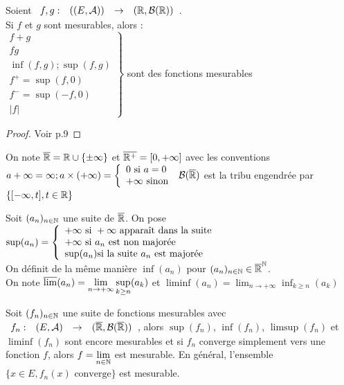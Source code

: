 \documentclass[]{report}
\begin{document}
\begin{prop}
    Soient $\begin{array}{ccccc} f,g : & ((E,\mathcal{A})) & \to & (\mathbb{R},\mathcal{B}(\mathbb{R})) \end{array}$.\\
    Si $f$ et $g$ sont mesurables, alors :\\
    $\left.\begin{array}{ll} f+g\\
    fg\\
    \inf(f,g);\sup(f,g)\\
    f^+=\sup(f,0)\\
    f^-=\sup(-f,0)\\
    |f|\end{array} \right\}$ sont des fonctions mesurables
\end{prop}

\begin{proof}
    Voir p.9
\end{proof}

\begin{df}
    On note $\overline{\mathbb{R}}=\mathbb{R}\cup\{\pm\infty\}$ et $\overline{\mathbb{R}^+}=[0,+\infty]$ avec les conventions $a+\infty=\infty;a\times(+\infty)=\left\{\begin{array}{ll} 0\text{ si }a=0\\
    +\infty\text{ sinon} \end{array} \right.$
    $\mathcal{B}(\overline{\mathbb{R}})$ est la tribu engendrée par $\{[-\infty,t],t\in\mathbb{R}\}$
\end{df}

\begin{df}
    Soit $(a_n)_{{n\in\mathbb{N}}}$ une suite de $\overline{\mathbb{R}}$. On pose $\sup(a_n)=\left\{\begin{array}{ll} +\infty\text{ si }+\infty\text{ apparaît dans la suite}\\
    +\infty\text{ si } a_n \text{ est non majorée}\\
    \sup (a_n)\text{si la suite }a_n\text{ est majorée} \end{array} \right.$\\
    On définit de la même manière $\inf(a_n)$ pour $(a_n)_{{n\in\mathbb{N}}}\in\overline{\mathbb{R}}^{\mathbb{N}}$. \\
    On note $\displaystyle{\overline{\lim}(a_n)=\lim_{n\to+\infty}\sup_{k\ge n}(a_k)}$ et $\displaystyle{\liminf(a_n)=\lim_{n\to+\infty}\inf_{k\ge n}(a_k)}$
\end{df}

\begin{prop}
    Soit $(f_n)_{{n\in\mathbb{N}}}$ une suite de fonctions mesurables avec $\begin{array}{ccccc} f_n : & (E,\mathcal{A}) & \to & (\overline{\mathbb{R}},\mathcal{B}(\overline{\mathbb{R}})) \end{array}$, alors $\sup(f_n)$, $\inf(f_n)$, $\limsup(f_n)$ et $\liminf(f_n)$ sont encore mesurables et si $f_n$ converge simplement vers une fonction $f$, alors $\displaystyle{f=\lim_{{n\in\mathbb{N}}}}$ est mesurable. En général, l'ensemble $\{x\in E,f_n(x)\text{ converge}\}$ est mesurable.
\end{prop}
\end{document}
